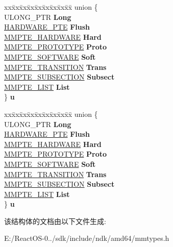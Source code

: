 \begin{DoxyCompactItemize}
\begin{tabbing}
\end{tabbing}\item 
\mbox{\label{struct___m_m_p_t_e_afba14eb8b515045de850422a60e04de9}} 
\begin{tabbing}
xx\=xx\=xx\=xx\=xx\=xx\=xx\=xx\=xx\=\kill
union \{\\
\>ULONG\_PTR {\bfseries Long}\\
\>\hyperlink{struct___h_a_r_d_w_a_r_e___p_t_e}{HARDWARE\_PTE} {\bfseries Flush}\\
\>\hyperlink{struct___m_m_p_t_e___h_a_r_d_w_a_r_e}{MMPTE\_HARDWARE} {\bfseries Hard}\\
\>\hyperlink{struct___m_m_p_t_e___p_r_o_t_o_t_y_p_e}{MMPTE\_PROTOTYPE} {\bfseries Proto}\\
\>\hyperlink{struct___m_m_p_t_e___s_o_f_t_w_a_r_e}{MMPTE\_SOFTWARE} {\bfseries Soft}\\
\>\hyperlink{struct___m_m_p_t_e___t_r_a_n_s_i_t_i_o_n}{MMPTE\_TRANSITION} {\bfseries Trans}\\
\>\hyperlink{struct___m_m_p_t_e___s_u_b_s_e_c_t_i_o_n}{MMPTE\_SUBSECTION} {\bfseries Subsect}\\
\>\hyperlink{struct___m_m_p_t_e___l_i_s_t}{MMPTE\_LIST} {\bfseries List}\\
\} {\bfseries u}\\

\end{tabbing}\item 
\mbox{\label{struct___m_m_p_t_e_a45de539d9b9aa8b678a398da432add12}} 
\begin{tabbing}
xx\=xx\=xx\=xx\=xx\=xx\=xx\=xx\=xx\=\kill
union \{\\
\>ULONG\_PTR {\bfseries Long}\\
\>\hyperlink{struct___h_a_r_d_w_a_r_e___p_t_e}{HARDWARE\_PTE} {\bfseries Flush}\\
\>\hyperlink{struct___m_m_p_t_e___h_a_r_d_w_a_r_e}{MMPTE\_HARDWARE} {\bfseries Hard}\\
\>\hyperlink{struct___m_m_p_t_e___p_r_o_t_o_t_y_p_e}{MMPTE\_PROTOTYPE} {\bfseries Proto}\\
\>\hyperlink{struct___m_m_p_t_e___s_o_f_t_w_a_r_e}{MMPTE\_SOFTWARE} {\bfseries Soft}\\
\>\hyperlink{struct___m_m_p_t_e___t_r_a_n_s_i_t_i_o_n}{MMPTE\_TRANSITION} {\bfseries Trans}\\
\>\hyperlink{struct___m_m_p_t_e___s_u_b_s_e_c_t_i_o_n}{MMPTE\_SUBSECTION} {\bfseries Subsect}\\
\>\hyperlink{struct___m_m_p_t_e___l_i_s_t}{MMPTE\_LIST} {\bfseries List}\\
\} {\bfseries u}\\

\end{tabbing}\end{DoxyCompactItemize}


该结构体的文档由以下文件生成\+:\begin{DoxyCompactItemize}
\item 
E\+:/\+React\+O\+S-\/0../sdk/include/ndk/amd64/mmtypes.\+h\end{DoxyCompactItemize}
